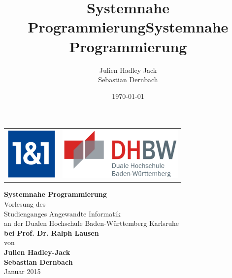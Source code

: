\documentclass[
    pagesize=pdftex,          %
    twoside=false,            %
    fontsize=12pt, %
    parskip=half,             %
    headsepline,              %
    footsepline,              %
    abstract=false,           %
    listof=totoc,             %
    toc=bibliography          %
]{scrreprt}
\title{Systemnahe Programmierung}
\author{}
\date{\today}
\begin{document}


\title{Systemnahe Programmierung}



\author{
        Julien Hadley Jack \\
        Sebastian Dernbach \\
      }


\begin{titlepage}
    \begin{longtable}{p{} p{}}
      {\includegraphics[height=2.6cm]{images/1und1-logo}} & 
      {\includegraphics[height=2.6cm]{images/dhbw.png}}
    \end{longtable}
    \enlargethispage{20mm}
    \begin{center}
      \vspace*{12mm}    {\LARGE\bf Systemnahe Programmierung}\\
      \vspace*{12mm}    Vorlesung des\\
      \vspace*{3mm} Studienganges Angewandte Informatik\\
      \vspace*{3mm}     an der Dualen Hochschule Baden-Württemberg Karlsruhe\\
      \vspace*{12mm}    {\large\bf bei Prof. Dr. Ralph Lausen}\\
      \vspace*{12mm}    von\\
      \vspace*{3mm}     {\large\bf Julien Hadley-Jack}\\{\large\bf Sebastian Dernbach}\\
      \vspace*{12mm}    Januar 2015\\
    \end{center}
    \vfill
\end{titlepage}
\end{document}
